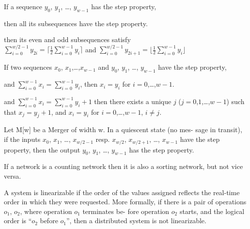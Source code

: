 {
	If a sequence $y_0$, $y_1$, \ldots , $y_{w-1}$ has the step property, 
	\begin{enum}
		\item then all its subsequences have the step property.
		\item then its even and odd subsequences satisfy\\
		$\sum_{i=0}^{w/2-1}y_{2i}= \lceil \frac{1}{2} \sum_{i=0}^{w-1} y_i \rceil$ and 
		$\sum_{i=0}^{w/2-1}y_{2i+1}= \lfloor \frac{1}{2} \sum_{i=0}^{w-1} y_i \rfloor$
	\end{enum}
}

{
	If two sequences $x_0$, $x_1$,\ldots,$x_{w-1}$ and $y_0$,
	$y_1$, \ldots, $y_{w-1}$ have the step property,
	\begin{enum}
		\item and $\sum_{i=0}^{w-1} x_i = \sum_{i=0}^{w-1} y_i$, then $x_i = y_i$
		for $i=0$,\ldots,$w-1$.
		\item and $\sum_{i=0}^{w-1} x_i = \sum_{i=0}^{w-1} y_i+1$ then there exists
		a unique $j$ ($j = 0$,$1$,\ldots,$w-1$) such that $x_j = y_j+1$, and $x_i
		=y_i$ for $i=0$,\ldots,$w-1$, $i \neq j$.
	\end{enum}
}

{
	Let M[w] be a Merger of width w. In a quiescent state (no mes- sage in
	transit), if the inputs $x_0$, $x_1$, \ldots , $x_{w/2-1}$ resp. $x_{w/2}$,
	$x_{w/2+1}$, \ldots, $x_{w-1}$ have the step property, then the output $y_0$,
	$y_1$, \ldots, $y_{w-1}$ has the step property. 
}

{
	If a network is a counting network then it is also a sorting network, but not
	vice versa.
}

{
	A system is linearizable if the order of the values assigned reflects the
	real-time order in which they were requested. More formally, if there is a
	pair of operations $o_1$, $o_2$, where operation $o_1$ terminates be- fore
	operation $o_2$ starts, and the logical order is ``$o_2$ before $o_1$'', then a
	distributed system is not linearizable.
}







